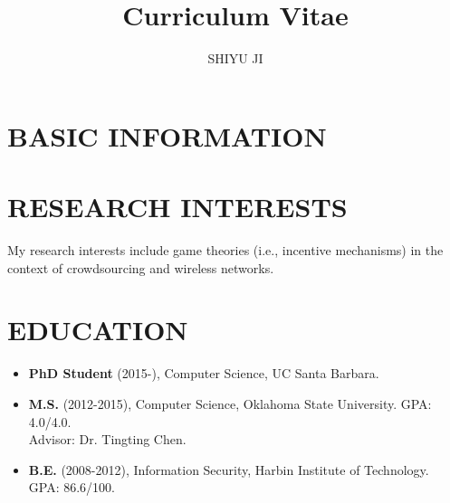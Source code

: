 \documentclass{article}
\begin{document}
\title{Curriculum Vitae}
\author{SHIYU JI}
\maketitle

\section{\uppercase{Basic Information}}

\section{\uppercase{Research Interests}}
My research interests include game theories (i.e., incentive mechanisms) in the context of crowdsourcing and wireless networks.

\section{\uppercase{Education}}
\begin{itemize}
\item {\bf PhD Student} (2015-), Computer Science, UC Santa Barbara.

\item {\bf M.S.} (2012-2015), Computer Science, Oklahoma State University. GPA: 4.0/4.0.\\
Advisor: Dr. Tingting Chen.

\item {\bf B.E.} (2008-2012), Information Security, Harbin Institute of Technology. GPA: 86.6/100.
\end{itemize}
\end{document}
